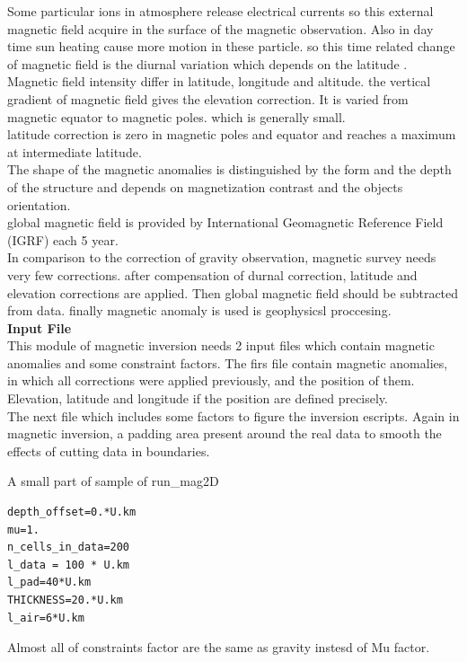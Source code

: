 Some particular ions in atmosphere release electrical currents so this external magnetic field acquire in the surface of the magnetic observation. Also in day time sun heating cause more motion in these particle. so this time related change of magnetic field is the diurnal variation which depends on the latitude . \\
Magnetic field intensity differ in latitude, longitude and altitude. the vertical gradient of magnetic field gives the elevation correction. It is varied from magnetic equator to magnetic poles. which is generally small.\\
latitude correction is zero in magnetic poles and equator and reaches a maximum at intermediate latitude.\\
The shape of the magnetic anomalies is distinguished by the form and the depth of the structure and depends on magnetization contrast and the objects orientation.\\
global magnetic field is provided by International Geomagnetic Reference Field (IGRF) each 5 year.\\

In comparison to the correction of gravity observation, magnetic survey needs very few corrections. after compensation of durnal correction, latitude and elevation corrections are applied. Then global magnetic field should be subtracted from data. finally magnetic anomaly is used is geophysicsl proccesing.\\

\textbf{Input File} \\

This module of magnetic inversion needs 2 input files which contain magnetic anomalies and some constraint factors. The firs file contain magnetic anomalies, in which all corrections were applied previously, and the position of them. Elevation, latitude and longitude if the position are defined precisely.\\
The next file which includes some factors to figure the inversion escripts. 
Again in magnetic inversion, a padding area present around the real data to smooth the effects of cutting data in boundaries.
 
A small part of sample of run_mag2D
\begin{verbatim}
depth_offset=0.*U.km
mu=1.
n_cells_in_data=200
l_data = 100 * U.km
l_pad=40*U.km
THICKNESS=20.*U.km
l_air=6*U.km
\end{verbatim}

Almost all of constraints factor are the same as gravity instesd of Mu factor.\\

